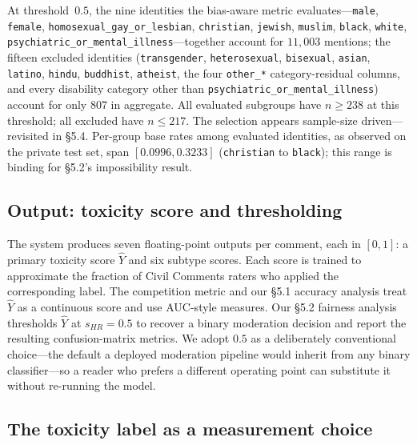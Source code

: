 \documentclass[11pt]{article}
\begin{document}
At threshold~$0.5$, the nine identities the bias-aware metric evaluates---\texttt{male}, \texttt{female}, \texttt{homosexual\_gay\_or\_lesbian}, \texttt{christian}, \texttt{jewish}, \texttt{muslim}, \texttt{black}, \texttt{white}, \texttt{psychiatric\_or\_mental\_illness}---together account for $11{,}003$ mentions; the fifteen excluded identities (\texttt{transgender}, \texttt{heterosexual}, \texttt{bisexual}, \texttt{asian}, \texttt{latino}, \texttt{hindu}, \texttt{buddhist}, \texttt{atheist}, the four \texttt{other\_*} category-residual columns, and every disability category other than \texttt{psychiatric\_or\_mental\_illness}) account for only $807$ in aggregate. All evaluated subgroups have $n \geq 238$ at this threshold; all excluded have $n \leq 217$. The selection appears sample-size driven---revisited in \S5.4. Per-group base rates among evaluated identities, as observed on the private test set, span $[0.0996, 0.3233]$ (\texttt{christian} to \texttt{black}); this range is binding for \S5.2's impossibility result.

\subsection{Output: toxicity score and thresholding}

The system produces seven floating-point outputs per comment, each in $[0, 1]$: a primary toxicity score $\hat{Y}$ and six subtype scores. Each score is trained to approximate the fraction of Civil Comments raters who applied the corresponding label. The competition metric and our \S5.1 accuracy analysis treat $\hat{Y}$ as a continuous score and use AUC-style measures. Our \S5.2 fairness analysis thresholds $\hat{Y}$ at $s_{HR} = 0.5$ to recover a binary moderation decision and report the resulting confusion-matrix metrics. We adopt $0.5$ as a deliberately conventional choice---the default a deployed moderation pipeline would inherit from any binary classifier---so a reader who prefers a different operating point can substitute it without re-running the model.

\subsection{The toxicity label as a measurement choice}
\end{document}
